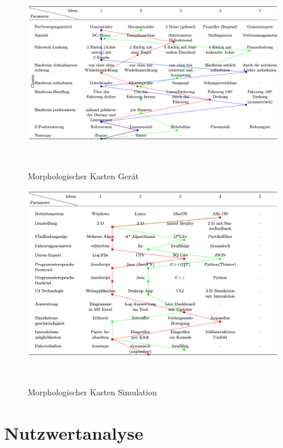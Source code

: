 \documentclass[main.tex]{subfiles} %
\begin{document}
\begin{figure}[h]
    \centering
    \includegraphics[width=1\textwidth]{./fig_Morphologischer_Kasten/Morphologischer_Kasten_3.png}
    \caption{Morphologischer Kasten Gerät}~\label{fig:Morphologischer_Kasten_3}
\end{figure}

\newpage

\begin{figure}[h]
    \centering
    \includegraphics[width=1\textwidth]{./fig_Morphologischer_Kasten/Morphologischer_Kasten_Simulation.png}
    \caption{Morphologischer Kasten Simulation}~\label{fig:Morphologischer_Kasten_Simulation}
\end{figure}

\newpage

\section{Nutzwertanalyse}~\label{appendix:Nutzwertanalyse}
\end{document}
